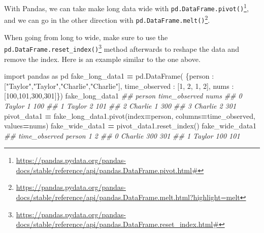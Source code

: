 \documentclass[
  12pt,
  krantz2]{krantz}
\makeatletter
\newenvironment{Shaded}{\begin{snugshade}}{\end{snugshade}}
\newcommand{\CommentTok}[1]{\textcolor[rgb]{0.37,0.37,0.37}{\textit{#1}}}
\newcommand{\DecValTok}[1]{\textcolor[rgb]{0.06,0.06,0.06}{#1}}
\newcommand{\ImportTok}[1]{#1}
\newcommand{\NormalTok}[1]{#1}
\newcommand{\OperatorTok}[1]{\textcolor[rgb]{0.43,0.43,0.43}{\textbf{#1}}}
\newcommand{\StringTok}[1]{\textcolor[rgb]{0.5,0.5,0.5}{#1}}
\renewcommand{\href}[2]{#2\footnote{\url{#1}}}
\newenvironment{kframe}{%
\medskip{}
\setlength{\fboxsep}{.8em}
 \def\at@end@of@kframe{}%
 \ifinner\ifhmode%
  \def\at@end@of@kframe{\end{minipage}}%
  \begin{minipage}{\columnwidth}%
 \fi\fi%
 \def\FrameCommand##1{\hskip\@totalleftmargin \hskip-\fboxsep
 \colorbox{shadecolor}{##1}\hskip-\fboxsep
     \hskip-\linewidth \hskip-\@totalleftmargin \hskip\columnwidth}%
 \MakeFramed {\advance\hsize-\width
   \@totalleftmargin\z@ \linewidth\hsize
   \@setminipage}}%
 {\par\unskip\endMakeFramed%
 \at@end@of@kframe}
\renewenvironment{Shaded}{\begin{kframe}}{\end{kframe}}
\makeatother
\begin{document}
With Pandas, we can take make long data wide with \href{https://pandas.pydata.org/pandas-docs/stable/reference/api/pandas.DataFrame.pivot.html\#}{\texttt{pd.DataFrame.pivot()}}, and we can go in the other direction with \href{https://pandas.pydata.org/pandas-docs/stable/reference/api/pandas.DataFrame.melt.html?highlight=melt}{\texttt{pd.DataFrame.melt()}}.

When going from long to wide, make sure to use the \href{https://pandas.pydata.org/pandas-docs/stable/reference/api/pandas.DataFrame.reset_index.html\#}{\texttt{pd.DataFrame.reset\_index()}} method afterwards to reshape the data and remove the index. Here is an example similar to the one above.

\begin{Shaded}
\begin{Highlighting}[]
\ImportTok{import}\NormalTok{ pandas }\ImportTok{as}\NormalTok{ pd}
\NormalTok{fake\_long\_data1 }\OperatorTok{=}\NormalTok{ pd.DataFrame(}
\NormalTok{  \{}\StringTok{\textquotesingle{}person\textquotesingle{}}\NormalTok{ : [}\StringTok{"Taylor"}\NormalTok{,}\StringTok{"Taylor"}\NormalTok{,}\StringTok{"Charlie"}\NormalTok{,}\StringTok{"Charlie"}\NormalTok{], }
  \StringTok{\textquotesingle{}time\_observed\textquotesingle{}}\NormalTok{ : [}\DecValTok{1}\NormalTok{, }\DecValTok{2}\NormalTok{, }\DecValTok{1}\NormalTok{, }\DecValTok{2}\NormalTok{],}
  \StringTok{\textquotesingle{}nums\textquotesingle{}}\NormalTok{ : [}\DecValTok{100}\NormalTok{,}\DecValTok{101}\NormalTok{,}\DecValTok{300}\NormalTok{,}\DecValTok{301}\NormalTok{]\})}
\NormalTok{fake\_long\_data1}
\CommentTok{\#\#     person  time\_observed  nums}
\CommentTok{\#\# 0   Taylor              1   100}
\CommentTok{\#\# 1   Taylor              2   101}
\CommentTok{\#\# 2  Charlie              1   300}
\CommentTok{\#\# 3  Charlie              2   301}
\NormalTok{pivot\_data1 }\OperatorTok{=}\NormalTok{ fake\_long\_data1.pivot(index}\OperatorTok{=}\StringTok{\textquotesingle{}person\textquotesingle{}}\NormalTok{, }
\NormalTok{                                    columns}\OperatorTok{=}\StringTok{\textquotesingle{}time\_observed\textquotesingle{}}\NormalTok{, }
\NormalTok{                                    values}\OperatorTok{=}\StringTok{\textquotesingle{}nums\textquotesingle{}}\NormalTok{)}
\NormalTok{fake\_wide\_data1 }\OperatorTok{=}\NormalTok{ pivot\_data1.reset\_index()}
\NormalTok{fake\_wide\_data1}
\CommentTok{\#\# time\_observed   person    1    2}
\CommentTok{\#\# 0              Charlie  300  301}
\CommentTok{\#\# 1               Taylor  100  101}
\end{Highlighting}
\end{Shaded}
\end{document}
